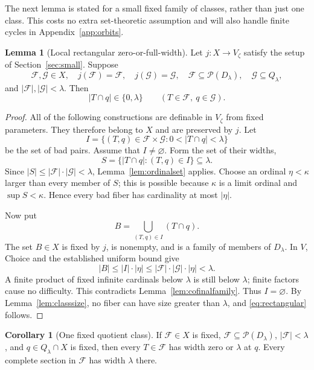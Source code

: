 \documentclass[11pt,letterpaper]{article}
\theoremstyle{definition}
\newtheorem{lemma}[definition]{Lemma}
\newtheorem{corollary}[definition]{Corollary}
\numberwithin{equation}{section}
\newcommand{\Pow}{\mathcal P}
\newcommand{\FF}{\mathcal F}
\newcommand{\calG}{\mathcal G}
\begin{document}
The next lemma is stated for a small fixed family of classes, rather than just one class. This costs no extra set-theoretic assumption and will also handle finite cycles in Appendix~\ref{app:orbits}.

\begin{lemma}[Local rectangular zero-or-full-width]\label{lem:rectangular}
Let $j:X\to V_\zeta$ satisfy the setup of Section~\ref{sec:small}. Suppose
\[
 \FF,\calG\in X,\quad j(\FF)=\FF,\quad j(\calG)=\calG,
 \quad\FF\subseteq\Pow(D_\lambda),\quad\calG\subseteq Q_\lambda,
\]
and $|\FF|,|\calG|<\lambda$. Then
\begin{equation}\label{eq:rectangular}
      |T\cap q|\in\{0,\lambda\}
           \qquad(T\in\FF,\ q\in\calG).
\end{equation}
\end{lemma}

\begin{proof}
All of the following constructions are definable in $V_\zeta$ from fixed parameters. They therefore belong to $X$ and are preserved by $j$. Let
\[
 I=\{(T,q)\in\FF\times\calG:0<|T\cap q|<\lambda\}
\]
be the set of bad pairs. Assume that $I\ne\varnothing$. Form the set of their widths,
\[
 S=\{|T\cap q|:(T,q)\in I\}\subseteq\lambda.
\]
Since $|S|\le|\FF|\cdot|\calG|<\lambda$, Lemma~\ref{lem:ordinalset} applies. Choose an ordinal $\eta<\kappa$ larger than every member of $S$; this is possible because $\kappa$ is a limit ordinal and $\sup S<\kappa$. Hence every bad fiber has cardinality at most $|\eta|$.

Now put
\[
                    B=\bigcup_{(T,q)\in I}(T\cap q).
\]
The set $B\in X$ is fixed by $j$, is nonempty, and is a family of members of $D_\lambda$. In $V$, Choice and the established uniform bound give
\begin{equation}\label{eq:unionbound}
 |B|\le |I|\cdot|\eta|
       \le |\FF|\cdot|\calG|\cdot|\eta|<\lambda.
\end{equation}
A finite product of fixed infinite cardinals below $\lambda$ is still below $\lambda$; finite factors cause no difficulty. This contradicts Lemma~\ref{lem:cofinalfamily}. Thus $I=\varnothing$. By Lemma~\ref{lem:classsize}, no fiber can have size greater than $\lambda$, and \eqref{eq:rectangular} follows.
\end{proof}

\begin{corollary}[One fixed quotient class]\label{cor:fixedclass}
If $\FF\in X$ is fixed, $\FF\subseteq\Pow(D_\lambda)$, $|\FF|<\lambda$, and $q\in Q_\lambda\cap X$ is fixed, then every $T\in\FF$ has width zero or $\lambda$ at $q$. Every complete section in $\FF$ has width $\lambda$ there.
\end{corollary}
\end{document}
